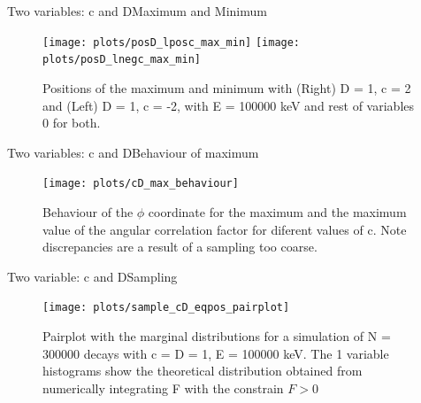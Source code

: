 \documentclass{beamer}
\begin{document}
\begin{frame}{Two variables: c and D}{Maximum and Minimum}
	\begin{figure}
		\centering
		\texttt{[image: plots/posD\_lposc\_max\_min]}
		\texttt{[image: plots/posD\_lnegc\_max\_min]}
		\caption{Positions of the maximum and minimum with (Right) D = 1, c = 2 and (Left) D = 1, c = -2, with E = 100000 keV and rest of variables 0 for both.}
	\end{figure}
\end{frame}
\begin{frame}{Two variables: c and D}{Behaviour of maximum}
	\begin{figure}
		\centering
		\texttt{[image: plots/cD\_max\_behaviour]}
		\caption{Behaviour of the $\phi$ coordinate for the maximum and the maximum value of the angular correlation factor for diferent values of c. Note discrepancies are a result of a sampling too coarse.}
	\end{figure}
\end{frame}

\begin{frame}{Two variable: c and D}{Sampling}
	\begin{figure}
		\centering
		\texttt{[image: plots/sample\_cD\_eqpos\_pairplot]}
		\caption{Pairplot with the marginal distributions for a simulation of N = 300000 decays with c = D = 1, E = 100000 keV. The 1 variable histograms show the theoretical distribution obtained from numerically integrating F with the constrain $F > 0$}
	\end{figure}
\end{frame}
\end{document}
